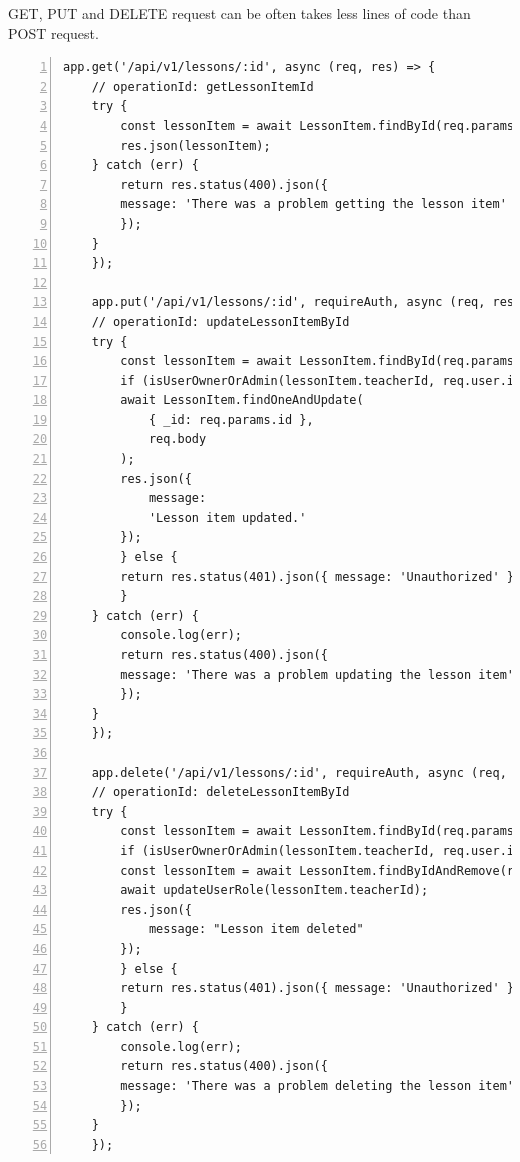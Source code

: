 GET, PUT and DELETE request can be often takes less lines of code than POST request.
\begin{lstlisting}[breaklines=true, numbers=left, stepnumber=1]
app.get('/api/v1/lessons/:id', async (req, res) => {
    // operationId: getLessonItemId
    try {
        const lessonItem = await LessonItem.findById(req.params.id).lean();
        res.json(lessonItem);
    } catch (err) {
        return res.status(400).json({
        message: 'There was a problem getting the lesson item'
        });
    }
    });
    
    app.put('/api/v1/lessons/:id', requireAuth, async (req, res) => {
    // operationId: updateLessonItemById
    try {
        const lessonItem = await LessonItem.findById(req.params.id).lean();
        if (isUserOwnerOrAdmin(lessonItem.teacherId, req.user.id)) {
        await LessonItem.findOneAndUpdate(
            { _id: req.params.id },
            req.body
        );
        res.json({
            message:
            'Lesson item updated.'
        });
        } else {
        return res.status(401).json({ message: 'Unauthorized' });
        }
    } catch (err) {
        console.log(err);
        return res.status(400).json({
        message: 'There was a problem updating the lesson item'
        });
    }
    });
    
    app.delete('/api/v1/lessons/:id', requireAuth, async (req, res) => {
    // operationId: deleteLessonItemById
    try {
        const lessonItem = await LessonItem.findById(req.params.id).lean();
        if (isUserOwnerOrAdmin(lessonItem.teacherId, req.user.id)) {
        const lessonItem = await LessonItem.findByIdAndRemove(req.params.id);
        await updateUserRole(lessonItem.teacherId);
        res.json({
            message: "Lesson item deleted"
        });
        } else {
        return res.status(401).json({ message: 'Unauthorized' });
        }
    } catch (err) {
        console.log(err);
        return res.status(400).json({
        message: 'There was a problem deleting the lesson item'
        });
    }
    });
\end{lstlisting}

